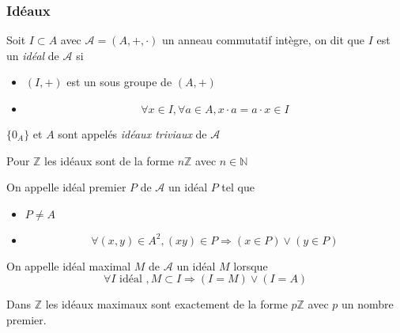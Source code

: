 \documentclass[11pt,colorlinks]{book}
\theoremstyle{mytheoremstyle}
\theoremstyle{mytheoremstyle}
\theoremstyle{mytheoremstyle}
\theoremstyle{mytheoremstyle}
\theoremstyle{mytheoremstyle}
\theoremstyle{mytheoremstyle}
\theoremstyle{mytheoremstyle}
\theoremstyle{mytheoremstyle}
\theoremstyle{myproblemstyle}
\def\mbb#1{\mathbb{#1}}
\def\bN{\mbb{N}}
\def\bZ{\mbb{Z}}
\begin{document}
\subsubsection{Idéaux}
\begin{definition}
  Soit $I \subset A$ avec $\mathcal A = (A,+,\cdot)$ un anneau commutatif intègre, on dit que $I$ est un \textit{idéal} de $\mathcal A$ si 
  \begin{itemize}
    \item $(I,+)$ est un sous groupe de $(A,+)$
    \item \begin{equation*}
      \forall x \in I, \forall a \in A, x\cdot a = a\cdot x \in I
    \end{equation*}
  \end{itemize}
\end{definition}
\begin{rmq}
  $\{0_A\}$ et $A$ sont appelés \textit{idéaux triviaux} de $\mathcal A$
\end{rmq}
\begin{ex}
  Pour $\bZ$ les idéaux sont de la forme $n\bZ$ avec $n \in \bN$
\end{ex}
\begin{definition}
  On appelle idéal premier $P$ de $\mathcal A$ un idéal $P$ tel que 
  \begin{itemize}
    \item $P \not= A$
    \item \begin{equation*}
      \forall (x,y) \in A^2, (xy) \in P \Rightarrow (x \in P) \vee (y \in P)
    \end{equation*}
  \end{itemize}
\end{definition}
\begin{definition}
  On appelle idéal maximal $M$ de $\mathcal A$ un idéal $M$ lorsque 
  \begin{equation*}
    \forall I \text{ idéal }, M \subset I \Rightarrow (I = M) \vee (I = A)
  \end{equation*}
\end{definition}
\begin{ex}
  Dans $\bZ$ les idéaux maximaux sont exactement de la forme $p\bZ$ avec $p$ un nombre premier.
\end{ex}
\end{document}

